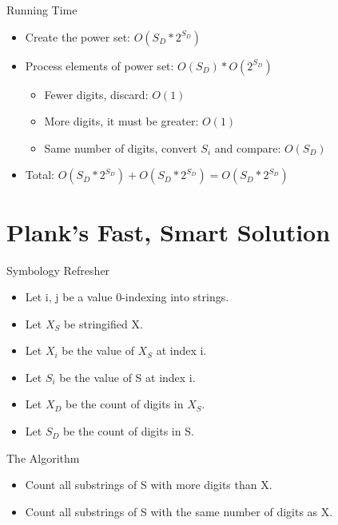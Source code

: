 \documentclass[10pt]{beamer}
\begin{document}
\begin{frame}{Running Time}
  \Large
  \begin{itemize} %
    \item Create the power set: $O(S_{D}*2^{S_{D}})$
    \item Process elements of power set: $O(S_{D}) * O(2^{S_{D}})$
      \begin{itemize}
        \large
        \item Fewer digits, discard: $O(1)$
        \item More digits, it must be greater: $O(1)$
        \item Same number of digits, convert $S_i$ and compare: $O(S_{D})$
      \end{itemize}
    \item Total: $O(S_{D}*2^{S_{D}}) + O(S_{D}*2^{S_{D}}) = O(S_{D}*2^{S_{D}})$
  \end{itemize}
\end{frame}

\section{Plank's Fast, Smart Solution}

\begin{frame}{Symbology Refresher}
  \Large
  \begin{itemize} %
    \item Let i, j be a value 0-indexing into strings.
    \item Let $X_{S}$ be stringified X.
    \item Let $X_{i}$ be the value of $X_{S}$  at index i.
    \item Let $S_{i}$ be the value of S at index i.
    \item Let $X_{D}$ be the count of digits in $X_{S}$.
    \item Let $S_{D}$ be the count of digits in S.
  \end{itemize}
\end{frame}

\begin{frame}{The Algorithm}
  \Large
  \begin{itemize} %
    \item Count all substrings of S with more digits than X. \\
    \item Count all substrings of S with the same number of digits as X. \\
  \end{itemize}
\end{frame}
\end{document}
